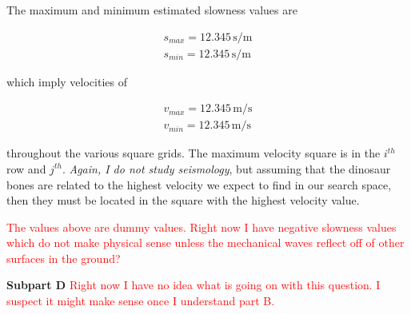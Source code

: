 The maximum and minimum estimated slowness values are 

\begin{align*}
	s_{max} = 12.345 \, \unit{\second\per\meter} \\
	s_{min} = 12.345 \, \unit{\second\per\meter}
\end{align*}

which imply velocities of

\begin{align*}
	v_{max} = 12.345 \, \unit{\meter\per\second} \\
	v_{min} = 12.345 \, \unit{\meter\per\second}
\end{align*}

throughout the various square grids. The maximum velocity square is in the $i^{th}$ row and $j^{th}$. \textit{Again, I do not study seismology}, but assuming that the dinosaur bones are related to the highest velocity we expect to find in our search space, then they must be located in the square with the highest velocity value. 

\textcolor{red}{The values above are dummy values. Right now I have negative slowness values which do not make physical sense unless the mechanical waves reflect off of other surfaces in the ground?} \newline

\textbf{Subpart D} \newline
\textcolor{red}{Right now I have no idea what is going on with this question. I suspect it might make sense once I understand part B.}


